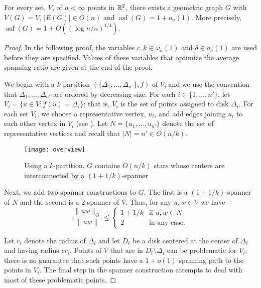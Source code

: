 \documentclass{patmorin}
\DeclareMathOperator{\asf}{asf}
\begin{document}
\begin{thm}
  For every set, $V$, of $n<\infty$ points in $\mathbb{R}^2$, there
  exists a geometric graph $G$ with $V(G)=V$, $|E(G)|\in O(n)$ and
  $\asf(G)=1+o_n(1)$.  More precisely, $\asf(G)=1+O((\log n/n)^{1/4})$.
\end{thm}

\begin{proof}
  In the following proof, the variables $c,k\in\omega_n(1)$ and $\delta\in
  o_n(1)$ are used before they are specified.  Values of these variables
  that optimize the average spanning ratio are given at the end of
  the proof.

  We begin with a $k$-partition $(\{\Delta_1,\ldots,\Delta_{n'}\},f)$
  of $V$, and we use the convention that $\Delta_1,\ldots,\Delta_{n'}$
  are ordered by decreasing size.  For each $i\in \{1,\ldots,n'\}$,
  let $V_i=\{u\in V : f(u)=\Delta_i\}$; that is, $V_i$ is the set of
  points assigned to disk $\Delta_i$.  For each set $V_i$, we choose a
  representative vertex, $u_i$, and add edges joining $u_i$ to each other
  vertex in $V_i$ (see ). Let $N=\{u_1,\ldots,u_{n'}\}$
  denote the set of representative vertices and recall that $|N|=n'\in
  O(n/k)$.

  \begin{figure}
    \begin{center} 
      \texttt{[image: overview]}
    \end{center} 
    \caption{Using a $k$-partition, $G$ contains $O(n/k)$ stars whose
      centers are interconnected by a $(1+1/k)$-spanner}
  \end{figure}

  Next, we add two spanner constructions to $G$.  The first is a
  $(1+1/k)$-spanner of $N$ and the second is a $2$-spanner of $V$.
  Thus, for any $u,w\in V$ we have
  \[
     \frac{\|uw\|_G}{\|uw\|} \le \begin{cases}
           1+1/k & \text{if $u,w\in N$} \\
           2 & \text{in any case.}
         \end{cases}
  \]
  
  Let $r_i$ denote the radius of $\Delta_i$ and let $D_i$ be a disk
  centered at the center of $\Delta_i$ and having radius $cr_i$.
  Points of $V$ that are in $D_i\setminus \Delta_i$ can be problematic
  for $V_i$; there is no guarantee that such points have a $1+o(1)$
  spanning path to the points in $V_i$.  The final step in the spanner
  construction attempts to deal with most of these problematic points.


\end{proof}
\end{document}

